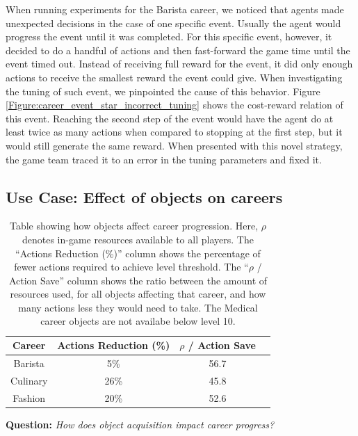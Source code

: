 \documentclass[letterpaper]{article} %
\begin{document}
When running experiments for the Barista career, we noticed that agents made unexpected decisions in the case of one specific event. Usually the agent would progress the event until it was completed. For this specific event, however, it decided to do a handful of actions and then fast-forward the game time until the event timed out. Instead of receiving full reward for the event, it did only enough actions to receive the smallest reward the event could give.
When investigating the tuning of such event, we pinpointed the cause of this behavior. Figure \ref{Figure:career_event_star_incorrect_tuning} shows the cost-reward relation of this event. Reaching the second step of the event would have the agent do at least twice as many actions when compared to stopping at the first step, but it would still generate the same reward. When presented with this novel strategy, the game team traced it to an error in the tuning parameters and fixed it.

\subsection{Use Case: Effect of objects on careers}

\begin{table}[t]
\begin{center}
\begin{tabular}{ |c|c|c|c| }
\hline
\textbf{Career} & \textbf{Actions Reduction (\%)} & \textbf{$\rho$ / Action Save} \\
\hline
Barista & 5\% & 56.7 \\
\hline
Culinary & 26\% & 45.8 \\
\hline
Fashion & 20\% & 52.6 \\
\hline
\end{tabular}
\end{center}
\caption{Table showing how objects affect career progression. Here, $\rho$ denotes in-game resources available to all players. The ``Actions Reduction (\%)'' column shows the percentage of fewer actions required to achieve level threshold. The ``$\rho$ / Action Save'' column shows the ratio between the amount of resources used, for all objects affecting that career, and how many actions less they would need to take. The Medical career objects are not availabe below level 10.}
\label{tbl1:object_career_table}
\end{table}

\textbf{Question:} {\em How does object acquisition impact career progress?}
\end{document}
